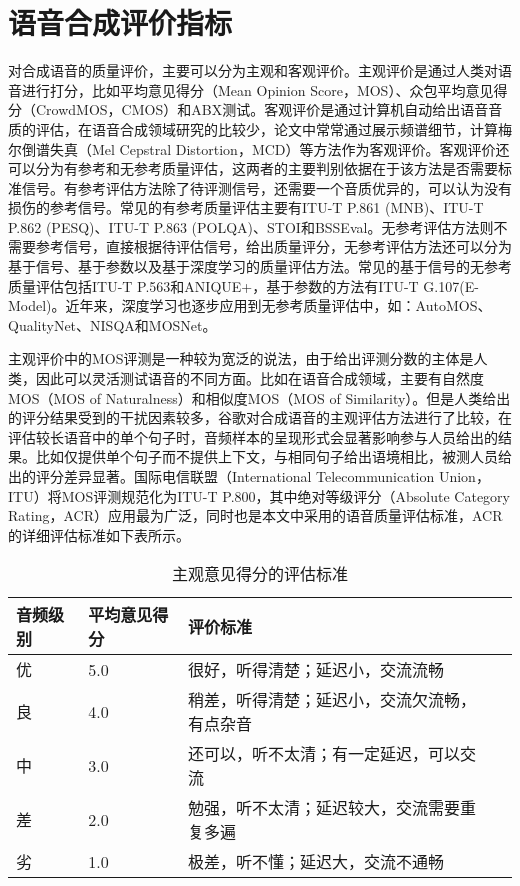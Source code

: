\documentclass[cn,10pt,math=newtx,citestyle=gb7714-2015,bibstyle=gb7714-2015]{elegantbook}
\begin{document}
\section{语音合成评价指标}
对合成语音的质量评价，主要可以分为主观和客观评价。主观评价是通过人类对语音进行打分，比如平均意见得分（Mean Opinion Score，MOS）、众包平均意见得分（CrowdMOS，CMOS）和ABX测试。客观评价是通过计算机自动给出语音音质的评估，在语音合成领域研究的比较少，论文中常常通过展示频谱细节，计算梅尔倒谱失真（Mel Cepstral Distortion，MCD）等方法作为客观评价。客观评价还可以分为有参考和无参考质量评估，这两者的主要判别依据在于该方法是否需要标准信号。有参考评估方法除了待评测信号，还需要一个音质优异的，可以认为没有损伤的参考信号。常见的有参考质量评估主要有ITU-T P.861 (MNB)、ITU-T P.862 (PESQ)、ITU-T P.863 (POLQA)、STOI和BSSEval。无参考评估方法则不需要参考信号，直接根据待评估信号，给出质量评分，无参考评估方法还可以分为基于信号、基于参数以及基于深度学习的质量评估方法。常见的基于信号的无参考质量评估包括ITU-T P.563和ANIQUE+，基于参数的方法有ITU-T G.107(E-Model)。近年来，深度学习也逐步应用到无参考质量评估中，如：AutoMOS、QualityNet、NISQA和MOSNet。

主观评价中的MOS评测是一种较为宽泛的说法，由于给出评测分数的主体是人类，因此可以灵活测试语音的不同方面。比如在语音合成领域，主要有自然度MOS（MOS of Naturalness）和相似度MOS（MOS of Similarity）。但是人类给出的评分结果受到的干扰因素较多，谷歌对合成语音的主观评估方法进行了比较，在评估较长语音中的单个句子时，音频样本的呈现形式会显著影响参与人员给出的结果。比如仅提供单个句子而不提供上下文，与相同句子给出语境相比，被测人员给出的评分差异显著。国际电信联盟（International Telecommunication Union，ITU）将MOS评测规范化为ITU-T P.800，其中绝对等级评分（Absolute Category Rating，ACR）应用最为广泛，同时也是本文中采用的语音质量评估标准，ACR的详细评估标准如下表所示。

\begin{table}[htbp]
  \centering
  \caption{主观意见得分的评估标准}
    \begin{tabular}{llll}
    \toprule
    音频级别 & 平均意见得分 & 评价标准 \\
    \midrule
    优 & 5.0 & 很好，听得清楚；延迟小，交流流畅 \\
    良 & 4.0 & 稍差，听得清楚；延迟小，交流欠流畅，有点杂音 \\
    中 & 3.0 & 还可以，听不太清；有一定延迟，可以交流 \\
    差 & 2.0 & 勉强，听不太清；延迟较大，交流需要重复多遍 \\
    劣 & 1.0 & 极差，听不懂；延迟大，交流不通畅 \\
    \bottomrule
    \end{tabular}%
\end{table}%
\end{document}
